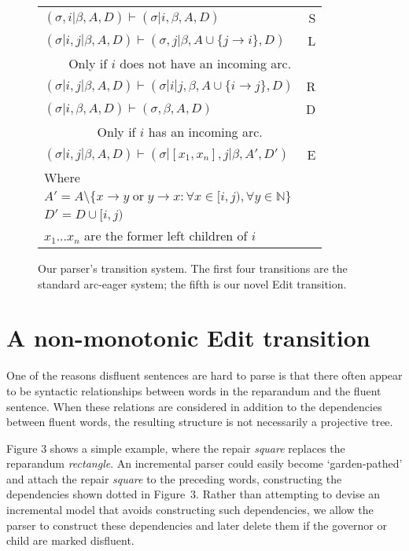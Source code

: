 \documentclass[11pt,letterpaper]{article}
\begin{document}
\begin{figure}
    \centering
    \small
    \begin{tabular}{lr}
        $(\sigma,i | \beta, A, D) \vdash (\sigma | i, \beta, A, D) $ \hfill & \hfill S \\
        $(\sigma | i,j | \beta, A, D) \vdash ( \sigma, j | \beta, A \cup \{ j \rightarrow i \}, D ) $ \hfill & \hfill L \\
        \multicolumn{2}{c}{Only if $i$ does not have an incoming arc.}\\
        $(\sigma | i,j | \beta, A, D) \vdash ( \sigma | i | j, \beta, A \cup \{ i \rightarrow j \}, D ) $ \hfill & \hfill R \\
        $(\sigma | i, \beta, A, D) \vdash ( \sigma, \beta, A, D )$ \hfill & \hfill  D \\
        \multicolumn{2}{c}{Only if $i$ has an incoming arc.}\\
    \hline
    $(\sigma | i, j | \beta, A, D) \vdash (\sigma | [x_1, x_n], j | \beta,A',D')$ & E \\
    Where \\
    $A' = A \setminus \{x \rightarrow y\;\mathrm{or}\; y \rightarrow x : \forall x \in [i, j), \forall y \in \mathbb{N} \}$ \\
$D' = D \cup [i, j)$ \\
    $x_1...x_n$ are the former left children of $i$ \\
    \end{tabular}
    \caption{\small Our parser's transition system.  The first four transitions
             are the standard arc-eager system; the fifth is our novel Edit
             transition.\label{fig:ae_notation}}
\end{figure}



\section{A non-monotonic Edit transition}
\label{sec:edittrans}

One of the reasons disfluent sentences are hard to parse is that there often appear
to be syntactic relationships between words in the reparandum and the fluent sentence.
When these relations are considered in addition to the dependencies between fluent words,
the resulting structure is not necessarily a projective tree.

Figure 3 shows a simple example, where the repair {\em square} replaces the
reparandum {\em rectangle}.  An incremental parser could easily become
`garden-pathed' and attach the repair {\em square} to the preceding words,
constructing the dependencies shown dotted in Figure~3.  Rather than attempting
to devise an incremental model that avoids constructing such dependencies, we
allow the parser to construct these dependencies and later delete them if the governor
or child are marked disfluent.
\end{document}
